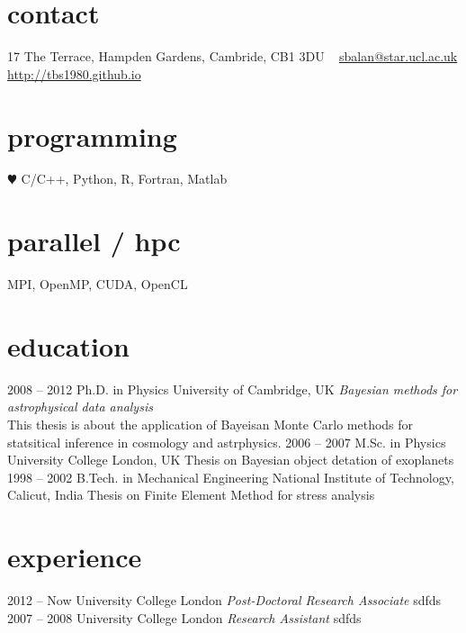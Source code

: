 \documentclass[]{friggeri-cv}
\begin{document}

    \begin{aside}%
        \section{contact}
            17 The Terrace,
            Hampden Gardens,
            Cambride, CB1 3DU
            ~
            \href{mailto:sbalan@star.ucl.ac.uk}{sbalan@star.ucl.ac.uk}
            \href{http://tbs1980.github.io}{http://tbs1980.github.io}
        \section{programming}
            {\color{red} $\varheartsuit$} C/C++,
            Python, R,
            Fortran, Matlab
        \section{parallel / hpc}
            MPI, OpenMP,
            CUDA, OpenCL
    \end{aside}


    \section{education}
        \begin{entrylist}
            \entry
            {2008 -- 2012}
            {Ph.D. {\normalfont in Physics}}
            {University of Cambridge, UK}
            {\emph{Bayesian methods for astrophysical data analysis} \\
            This thesis is about the application of Bayeisan Monte Carlo methods for\\
            statsitical inference in cosmology and astrphysics.}
            \entry
            {2006 -- 2007}
            {M.Sc. {\normalfont in Physics}}
            {University College London, UK}
            {Thesis on Bayesian object detation of exoplanets}
            \entry
            {1998 -- 2002}
            {B.Tech. {\normalfont in Mechanical Engineering}}
            {National Institute of Technology, Calicut, India}
            {Thesis on Finite Element Method for stress analysis}
        \end{entrylist}

    \section{experience}
        \begin{entrylist}
            \entry
            {2012 -- Now}
            {University College London}
            {\emph{Post-Doctoral Research Associate}}
            {sdfds}
            \entry
            {2007 -- 2008}
            {University College London}
            {\emph{Research Assistant}}
            {sdfds}
        \end{entrylist}
\end{document}
